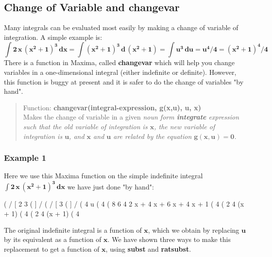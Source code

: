 \documentclass[12pt]{article}
\begin{document}
\subsection{Change of Variable and \textbf{changevar} }
Many integrals can be evaluated most easily by making a change of variable of
  integration.
A simple example is:
\begin{equation}
\mathbf{\int 2 \, x \, (x^2+1)^3 \, dx = \int (x^2+1)^3\,d\,(x^2+1) = \int u^3\, du = u^4/4 = (x^2+1)^4/4}
\end{equation}
There is a function in Maxima, called \textbf{changevar} which will help you change variables
  in a one-dimensional integral (either indefinite or definite).
However, this function is buggy at present and it is safer to do the
  change of variables "by hand".
\begin{quote}
Function: \textbf{changevar(integral-expression, g(x,u), u, x)}\\ 
Makes the change of variable in a given \it noun form \rm \textbf{integrate}
  expression such that the old variable of integration is $\mathbf{x}$, the
  new variable of integration is $\mathbf{u}$, and $\mathbf{x}$ and $\mathbf{u}$ are
  related by the equation $\mathbf{g(x,u) = 0}$. 
\end{quote}
\newpage
\subsubsection*{Example 1}
Here we use this Maxima function on the simple indefinite integral 
   $\mathbf{\int 2\,x\,(x^{2}+1)^{3} \, dx}$ we have just done "by hand":  
\begin{myVerbatim}
(%
                                /
                                [     2     3
(%
                                ]
                                /
(%
                                    /
                                    [  3
(%
                                    ]
                                    /
(%
                                       4
                                      u
(%
                                      4
(%
                           8      6      4      2
                          x  + 4 x  + 6 x  + 4 x  + 1
(%
                                       4
(%
                                     2     4
                                   (x  + 1)
(%
                                       4
(%
                                     2     4
                                   (x  + 1)
(%
                                       4									  
\end{myVerbatim} 
The original indefinite integral is a function of $\mathbf{x}$, which we obtain
  by replacing $\mathbf{u}$ by its equivalent as a function of $\mathbf{x}$.
We have shown three ways to make this replacement to get a function of $\mathbf{x}$,
 using \textbf{subst}  and \textbf{ratsubst}.
\end{document}
